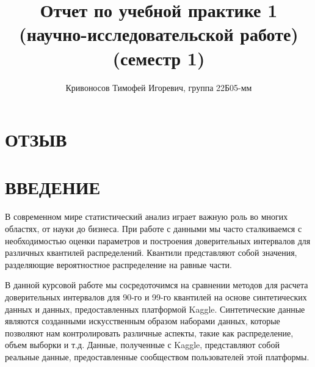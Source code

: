 \documentclass[specialist,
               substylefile = spbu_report.rtx,
               subf,href,colorlinks=true, 12pt]{disser}
\begin{document}
%
%


\title{ Отчет по учебной практике 1 (научно-исследовательской работе) (семестр 1)}


\author{Кривоносов Тимофей Игоревич, группа 22Б05-мм}





\date{\number\year}

\maketitle

\newpage
\section{ОТЗЫВ}

\newpage
\tableofcontents
\newpage

\section{ВВЕДЕНИЕ}
В современном мире статистический анализ играет важную роль во многих областях, от науки до бизнеса. При работе с данными мы часто сталкиваемся с необходимостью оценки параметров и построения доверительных интервалов для различных квантилей распределений. Квантили представляют собой значения, разделяющие вероятностное распределение на равные части.

В данной курсовой работе мы сосредоточимся на сравнении методов для расчета доверительных интервалов для 90-го и 99-го квантилей на основе синтетических данных и данных, предоставленных платформой Kaggle. Синтетические данные являются созданными искусственным образом наборами данных, которые позволяют нам контролировать различные аспекты, такие как распределение, объем выборки и т.д. Данные, полученные с Kaggle, представляют собой реальные данные, предоставленные сообществом пользователей этой платформы.
\end{document}
